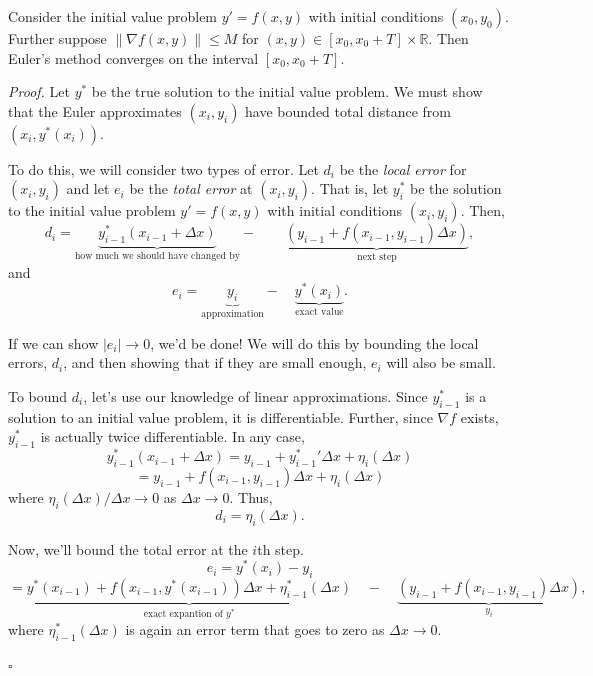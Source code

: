 \documentclass{problemset}
\newcommand{\R}{\mathbb{R}}
\newenvironment{proof}{\emph{Proof.}}{\hfill$\square$}
\begin{document}
	\begin{theorem}
		Consider the initial value problem $y'=f(x,y)$ with initial conditions
		$(x_0,y_0)$.  Further suppose $\|\nabla f(x,y)\| \leq M$ for $(x,y)\in [x_0,x_0+T]\times\R$.
		Then Euler's method converges on the interval $[x_0,x_0+T]$.
	\end{theorem}

	\begin{proof}
		Let $y^*$ be the true solution to the initial value problem.  We must show that
		the Euler approximates $(x_i,y_i)$ have bounded total distance from $(x_i, y^*(x_i))$.
		
		To do this, we will consider two types of error.  Let $d_i$ be the \emph{local error}
		for $(x_i,y_i)$ and let $e_i$ be the \emph{total error} at $(x_i,y_i)$.  That is,
		let $y^*_i$ be the solution to the initial value problem $y'=f(x,y)$ with initial conditions
		$(x_i,y_i)$.  Then,
		\[
			d_i = \underbrace{y_{i-1}^*(x_{i-1}+\Delta x)}_{\text{how much
			we should have changed by}}-\qquad \underbrace{(y_{i-1} + f(x_{i-1},y_{i-1})\Delta x)}_{\text{next step}},
		\]
		and 
		\[
			e_i = \underbrace{y_i}_{\text{approximation}} -\quad \underbrace{y^*(x_i)}_{\text{exact value}}.
		\]

		If we can show $|e_i|\to 0$, we'd be done!  We will do this by bounding the local errors, $d_i$,
		and then showing that if they are small enough, $e_i$ will also be small.

		To bound $d_i$, let's use our knowledge of linear approximations.  Since $y_{i-1}^*$ is
		a solution to an initial value problem, it is differentiable.  Further, since $\nabla f$
		exists, $y_{i-1}^*$ is actually twice differentiable.  In any case,
		\[
			y_{i-1}^*(x_{i-1}+\Delta x) = y_{i-1} + {y_{i-1}^*}'\Delta x + \eta_i(\Delta x)
		\]
		\[
			=y_{i-1} + f(x_{i-1},y_{i-1})\Delta x + \eta_i(\Delta x)
		\]
		where $\eta_i(\Delta x)/\Delta x\to 0$ as $\Delta x\to 0$. Thus,
		\[
			d_i = \eta_i(\Delta x).
		\]

		Now, we'll bound the total error at the $i$th step.
		\[
			e_i = y^*(x_{i}) - y_{i} 
		\]\[=
			\underbrace{y^*(x_{i-1}) + f(x_{i-1}, y^*(x_{i-1}))\Delta x + 
			\eta^*_{i-1}(\Delta x)}_{\text{exact expantion of $y^*$}} \quad-\quad \underbrace{(y_{i-1} + f(x_{i-1}, y_{i-1})\Delta x)}_{y_i},
		\]
		where $\eta_{i-1}^*(\Delta x)$ is again an error term that goes to zero as $\Delta x\to 0$.


\end{proof}
\end{document}
